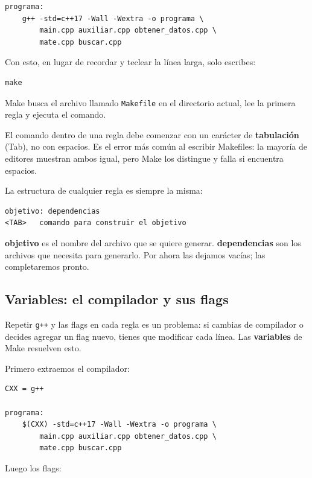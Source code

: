 \documentclass[12pt, oneside]{article}
\begin{document}
\begin{verbatim}
programa:
	g++ -std=c++17 -Wall -Wextra -o programa \
	    main.cpp auxiliar.cpp obtener_datos.cpp \
	    mate.cpp buscar.cpp
\end{verbatim}

Con esto, en lugar de recordar y teclear la línea larga, solo escribes:

\begin{verbatim}
make
\end{verbatim}

Make busca el archivo llamado \texttt{Makefile} en el directorio actual,
lee la primera regla y ejecuta el comando.

\begin{advertencia}
  El comando dentro de una regla debe comenzar con un carácter de
  \textbf{tabulación} (Tab), no con espacios.  Es el error más común al
  escribir Makefiles: la mayoría de editores muestran ambos igual, pero
  Make los distingue y falla si encuentra espacios.
\end{advertencia}

La estructura de cualquier regla es siempre la misma:

\begin{verbatim}
objetivo: dependencias
<TAB>   comando para construir el objetivo
\end{verbatim}

\textbf{objetivo} es el nombre del archivo que se quiere generar.
\textbf{dependencias} son los archivos que necesita para generarlo.
Por ahora las dejamos vacías; las completaremos pronto.

\subsection{Variables: el compilador y sus flags}

Repetir \texttt{g++} y las flags en cada regla es un problema: si cambias
de compilador o decides agregar un flag nuevo, tienes que modificar cada
línea.  Las \textbf{variables} de Make resuelven esto.

Primero extraemos el compilador:

\begin{verbatim}
CXX = g++

programa:
	$(CXX) -std=c++17 -Wall -Wextra -o programa \
	    main.cpp auxiliar.cpp obtener_datos.cpp \
	    mate.cpp buscar.cpp
\end{verbatim}

Luego los flags:
\end{document}
